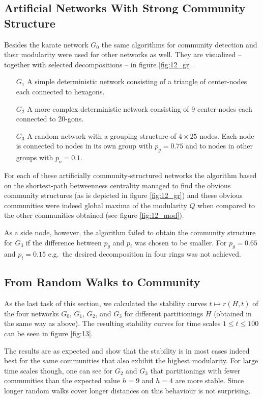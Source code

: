 \documentclass{scrartcl}
\begin{document}
\subsection{Artificial Networks With Strong Community Structure}
Besides the karate network $G_0$ the same algorithms for community
detection and their modularity were used for other networks as well.
They are visualized -- together with selected decompositions -- in figure
\ref{fig:12_gr}.
\begin{itemize}
    \item [\textbf{$G_1$}] A simple deterministic network consisting of
        a triangle of center-nodes each connected to hexagons.
    \item [\textbf{$G_2$}] A more complex deterministic network consisting
        of 9 center-nodes each connected to 20-gons.
    \item [\textbf{$G_3$}] A random network with a grouping structure of
        $4\times 25$ nodes. Each node is connected to nodes in its own
        group with $p_g=0.75$ and to nodes in other groups with $p_o
        = 0.1$.
\end{itemize}

For each of these artificially community-structured networks the
algorithm based on the shortest-path betweenness centrality managed to find
the obvious community structures (as is depicted in figure
\ref{fig:12_gr}) and these obvious communities were indeed global
maxima of the modularity $Q$ when compared to the other communities
obtained (see figure \ref{fig:12_mod}).

As a side node, however, the algorithm failed to obtain the community
structure for $G_3$ if the difference between $p_g$ and $p_i$ was chosen
to be smaller. For $p_g = 0.65$ and $p_i = 0.15$ e.g.\ the desired
decomposition in four rings was not achieved.

\subsection{From Random Walks to Community}
As the last task of this section, we calculated the stability curves
$t\mapsto r(H, t)$ of the four networks $G_0$, $G_1$, $G_2$, and $G_3$ for
different partitionings $H$ (obtained in the same way as above). The
resulting stability curves for time scales $1\le t \le 100$ can be seen in
figure \ref{fig:13}.

The results are as expected and show that the stability is in most cases
indeed best for the same communities that also exhibit the highest
modularity. For large time scales though, one can see for $G_2$ and $G_3$ that
partitionings with fewer communities than the expected value $h = 9$ and
$h=4$ are more stable. Since longer random walks cover longer distances on
this behaviour is not surprising.
\end{document}
